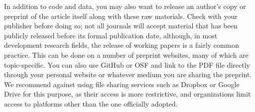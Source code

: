 In addition to code and data,
you may also want to release an author's copy or preprint
of the article itself along with these raw materials.
Check with your publisher before doing so;
not all journals will accept material that has been publicly released
before its formal publication date, although,
in most development research fields,
the release of working papers is a fairly common practice.
This can be done on a number of preprint websites,
many of which are topic-specific.
You can also use GitHub or OSF and link to the PDF file directly
through your personal website or whatever medium you are sharing the preprint.
We recommend against using file sharing services such as
Dropbox or Google Drive for this purpose,
as their access is more restrictive,
and organizations limit access to platforms other than the one officially adopted.
